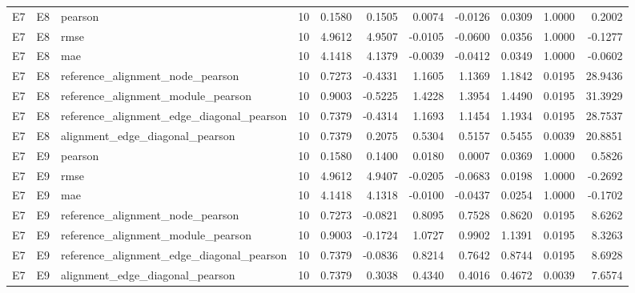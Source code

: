 \begin{tabular}{lllrrrrrrrr}
E7 & E8 & pearson & 10 & 0.1580 & 0.1505 & 0.0074 & -0.0126 & 0.0309 & 1.0000 & 0.2002 \\
E7 & E8 & rmse & 10 & 4.9612 & 4.9507 & -0.0105 & -0.0600 & 0.0356 & 1.0000 & -0.1277 \\
E7 & E8 & mae & 10 & 4.1418 & 4.1379 & -0.0039 & -0.0412 & 0.0349 & 1.0000 & -0.0602 \\
E7 & E8 & reference_alignment_node_pearson & 10 & 0.7273 & -0.4331 & 1.1605 & 1.1369 & 1.1842 & 0.0195 & 28.9436 \\
E7 & E8 & reference_alignment_module_pearson & 10 & 0.9003 & -0.5225 & 1.4228 & 1.3954 & 1.4490 & 0.0195 & 31.3929 \\
E7 & E8 & reference_alignment_edge_diagonal_pearson & 10 & 0.7379 & -0.4314 & 1.1693 & 1.1454 & 1.1934 & 0.0195 & 28.7537 \\
E7 & E8 & alignment_edge_diagonal_pearson & 10 & 0.7379 & 0.2075 & 0.5304 & 0.5157 & 0.5455 & 0.0039 & 20.8851 \\
E7 & E9 & pearson & 10 & 0.1580 & 0.1400 & 0.0180 & 0.0007 & 0.0369 & 1.0000 & 0.5826 \\
E7 & E9 & rmse & 10 & 4.9612 & 4.9407 & -0.0205 & -0.0683 & 0.0198 & 1.0000 & -0.2692 \\
E7 & E9 & mae & 10 & 4.1418 & 4.1318 & -0.0100 & -0.0437 & 0.0254 & 1.0000 & -0.1702 \\
E7 & E9 & reference_alignment_node_pearson & 10 & 0.7273 & -0.0821 & 0.8095 & 0.7528 & 0.8620 & 0.0195 & 8.6262 \\
E7 & E9 & reference_alignment_module_pearson & 10 & 0.9003 & -0.1724 & 1.0727 & 0.9902 & 1.1391 & 0.0195 & 8.3263 \\
E7 & E9 & reference_alignment_edge_diagonal_pearson & 10 & 0.7379 & -0.0836 & 0.8214 & 0.7642 & 0.8744 & 0.0195 & 8.6928 \\
E7 & E9 & alignment_edge_diagonal_pearson & 10 & 0.7379 & 0.3038 & 0.4340 & 0.4016 & 0.4672 & 0.0039 & 7.6574 \\
\bottomrule
\end{tabular}
